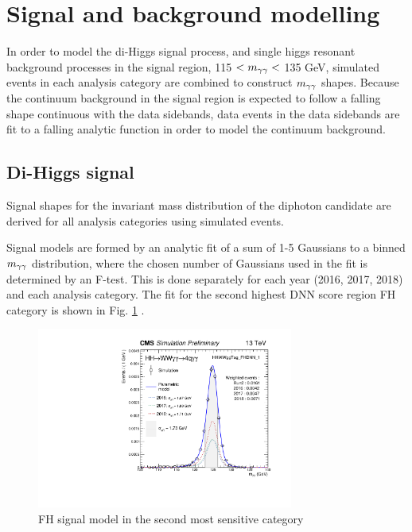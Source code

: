 \section{Signal and background modelling} \label{sec:AnalyticFitting}

In order to model the di-Higgs signal process, and single higgs resonant background processes in the signal region, 115 $< m_{\gamma\gamma} < $ 135 GeV, simulated events 
in each analysis category are combined to construct $m_{\gamma\gamma}$ shapes. Because the continuum background in the signal region is expected to follow a falling 
shape continuous with the data sidebands, data events in the data sidebands are fit to a falling analytic function in order to model the continuum background. 

\subsection{Di-Higgs signal}
\label{sec:SignalFitting}

Signal shapes for the invariant mass distribution of the diphoton candidate are derived for all analysis categories using simulated events. 

Signal models are formed by an analytic fit of a sum of 1-5 Gaussians to a binned $m_{\gamma\gamma}$ distribution, where the chosen number of Gaussians used in the fit is 
determined by an F-test. This is done separately for each year (2016, 2017, 2018) and each analysis category.
The fit for the second highest DNN score region FH category is shown 
in Fig.  \ref{fig:FHSignalModel} . 



\begin{figure}[!htbp]
  \centering
  \includegraphics[width=0.75\textwidth]{Images/AnalyticFitting/Signal/smodel_HHWWggTag_FHDNN_1.pdf}
  \caption{FH signal model in the second most sensitive category}
\label{fig:FHSignalModel}
\end{figure}

